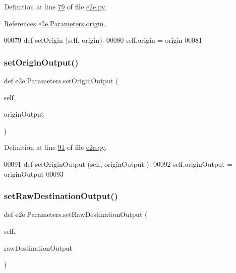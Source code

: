 Definition at line \hyperlink{e2e_8py_source_l00079}{79} of file \hyperlink{e2e_8py_source}{e2e.\+py}.



References \hyperlink{e2e_8py_source_l00033}{e2e.\+Parameters.\+origin}.


\begin{DoxyCode}
00079     \textcolor{keyword}{def }setOrigin (self, origin):
00080         self.origin = origin
00081 
\end{DoxyCode}
\mbox{\label{classe2e_1_1_parameters_a2b87a3357a16d35b7606a97e924a4904}} 
\subsubsection{\texorpdfstring{set\+Origin\+Output()}{setOriginOutput()}}
{\footnotesize\ttfamily def e2e.\+Parameters.\+set\+Origin\+Output (\begin{DoxyParamCaption}\item[{}]{self,  }\item[{}]{origin\+Output }\end{DoxyParamCaption})}



Definition at line \hyperlink{e2e_8py_source_l00091}{91} of file \hyperlink{e2e_8py_source}{e2e.\+py}.


\begin{DoxyCode}
00091     \textcolor{keyword}{def }setOriginOutput (self, originOutput ):
00092         self.originOutput  = originOutput 
00093 
\end{DoxyCode}
\mbox{\label{classe2e_1_1_parameters_a2a4420c79bef43533fe2d9562d0faedb}} 
\subsubsection{\texorpdfstring{set\+Raw\+Destination\+Output()}{setRawDestinationOutput()}}
{\footnotesize\ttfamily def e2e.\+Parameters.\+set\+Raw\+Destination\+Output (\begin{DoxyParamCaption}\item[{}]{self,  }\item[{}]{raw\+Destination\+Output }\end{DoxyParamCaption})}




